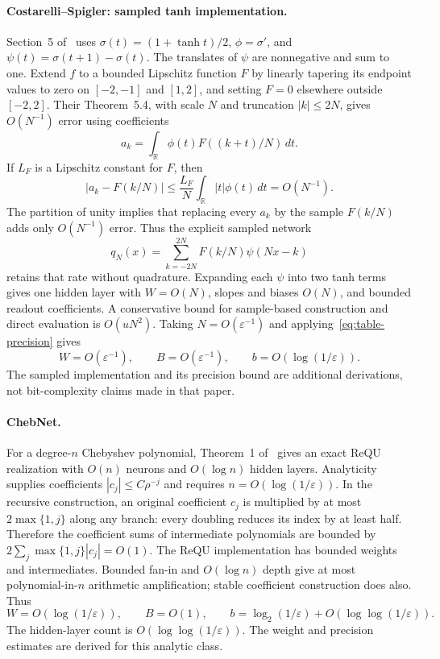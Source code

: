 \paragraph{Costarelli--Spigler: sampled tanh implementation.}
Section~5 of~\cite{Costarelli2015Approximation} uses
$\sigma(t)=(1+\tanh t)/2$, $\phi=\sigma'$, and
$\psi(t)=\sigma(t+1)-\sigma(t)$. The translates of $\psi$ are nonnegative
and sum to one. Extend $f$ to a bounded Lipschitz function $F$ by linearly
tapering its endpoint values to zero on $[-2,-1]$ and $[1,2]$, and setting
$F=0$ elsewhere outside $[-2,2]$.
Their Theorem~5.4, with scale $N$ and truncation $|k|\le2N$, gives
$O(N^{-1})$ error using coefficients
\[
 a_k=\int_{\mathbb R}\phi(t)F((k+t)/N)\,dt.
\]
If $L_F$ is a Lipschitz constant for $F$, then
\[
 |a_k-F(k/N)|\le\frac{L_F}{N}
 \int_{\mathbb R}|t|\phi(t)\,dt=O(N^{-1}).
\]
The partition of unity implies that replacing every $a_k$ by the sample
$F(k/N)$ adds only $O(N^{-1})$ error. Thus the explicit sampled network
\[
 q_N(x)=\sum_{k=-2N}^{2N}F(k/N)\psi(Nx-k)
\]
retains that rate without quadrature. Expanding each $\psi$ into two tanh
terms gives one hidden layer with $W=O(N)$, slopes and biases $O(N)$,
and bounded readout coefficients. A conservative bound for sample-based
construction and direct evaluation is $O(uN^2)$. Taking
$N=O(\varepsilon^{-1})$ and applying~\eqref{eq:table-precision} gives
\[
 W=O(\varepsilon^{-1}),\qquad B=O(\varepsilon^{-1}),\qquad
 b=O(\log(1/\varepsilon)).
\]
The sampled implementation and its precision bound are additional
derivations, not bit-complexity claims made in that paper.

\paragraph{ChebNet.}
For a degree-$n$ Chebyshev polynomial,
Theorem~1 of~\cite{tang2019chebnet} gives an exact ReQU realization
with $O(n)$ neurons and $O(\log n)$ hidden layers.
Analyticity supplies coefficients $|c_j|\le C\rho^{-j}$ and requires
$n=O(\log(1/\varepsilon))$.
In the recursive construction, an original coefficient $c_j$ is
multiplied by at most $2\max\{1,j\}$ along any branch: every doubling
reduces its index by at least half. Therefore the coefficient sums
of intermediate polynomials are bounded by
$2\sum_j\max\{1,j\}|c_j|=O(1)$.
The ReQU implementation has bounded weights and intermediates.
Bounded fan-in and $O(\log n)$ depth give at most polynomial-in-$n$
arithmetic amplification; stable coefficient construction does also.
Thus
\[
 W=O(\log(1/\varepsilon)),\qquad B=O(1),\qquad
 b=\log_2(1/\varepsilon)+O(\log\log(1/\varepsilon)).
\]
The hidden-layer count is $O(\log\log(1/\varepsilon))$.
The weight and precision estimates are derived for this analytic class.

